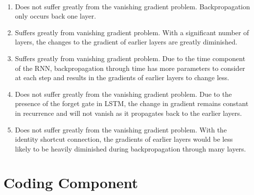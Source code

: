 \documentclass[12pt]{article}
\newenvironment{solution}[2][Solution]{\begin{trivlist}
\item[\hskip \labelsep {\bfseries #1}]}{\end{trivlist}}
\begin{document}
\begin{solution}{}~
\begin{enumerate}
\item Does not suffer greatly from the vanishing gradient problem. Backpropagation only occurs back one layer.
\item Suffers greatly from vanishing gradient problem. With a significant number of layers, the changes to the gradient of earlier layers are greatly diminished.
\item Suffers greatly from vanishing gradient problem. Due to the time component of the RNN, backpropagation through time has more parameters to consider at each step and results in the gradients of earlier layers to change less.
\item Does not suffer greatly from the vanishing gradient problem. Due to the presence of the forget gate in LSTM, the change in gradient remains constant in recurrence and will not vanish as it propagates back to the earlier layers. 
\item Does not suffer greatly from the vanishing gradient problem. With the identity shortcut connection, the gradients of earlier layers would be less likely to be heavily diminished during backpropagation through many layers.
\end{enumerate}
\end{solution}

\section{Coding Component}


\end{document}
